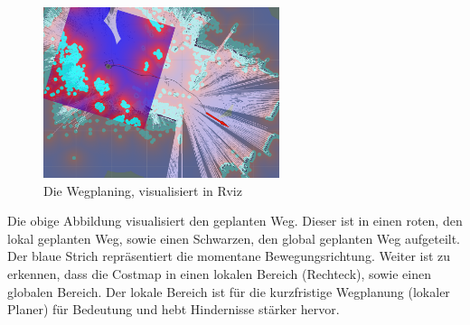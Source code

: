 {{			\begin{figure}[H]
				\centering				\includegraphics[height=5cm]{Bilder/costmap_pathplanning.png}
				\caption{Die Wegplaning, visualisiert in Rviz} 
				\label{pic:costpathplanning}
			\end{figure}
			
			Die obige Abbildung visualisiert den geplanten Weg. Dieser ist in einen roten, den lokal geplanten Weg, sowie einen Schwarzen, den global geplanten Weg aufgeteilt. Der blaue Strich repräsentiert die momentane Bewegungsrichtung. Weiter ist zu erkennen, dass die Costmap in einen lokalen Bereich (Rechteck), sowie einen globalen Bereich. Der lokale Bereich ist für die kurzfristige Wegplanung (lokaler Planer) für Bedeutung und hebt Hindernisse stärker hervor.
			
		}
}
